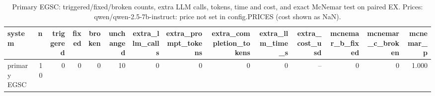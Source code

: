 \begin{table}[htbp]
\caption{Primary EGSC: triggered/fixed/broken counts, extra LLM calls, tokens, time and cost, and exact McNemar test on paired EX. Prices: qwen/qwen-2.5-7b-instruct: price not set in config.PRICES (cost shown as NaN).}
\label{tab:task3_egsc_counts}
\begin{tabular}{lrrrrrrrrrrrrr}
\toprule
system & n & triggered & fixed & broken & unchanged & extra\_llm\_calls & extra\_prompt\_tokens & extra\_completion\_tokens & extra\_llm\_time\_s & extra\_cost\_usd & mcnemar\_b\_fixed & mcnemar\_c\_broken & mcnemar\_p \\
\midrule
primary EGSC & 10 & 0 & 0 & 0 & 10 & 0 & 0 & 0 & 0 & -- & 0 & 0 & 1.000 \\
\bottomrule
\end{tabular}
\end{table}
